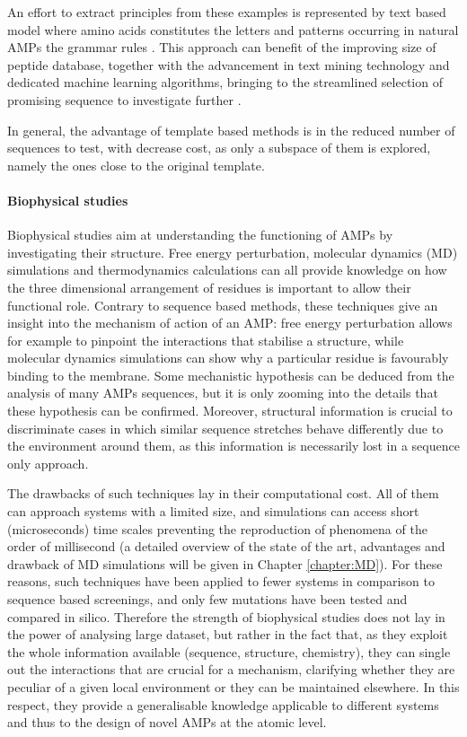 An effort to extract principles from these examples is represented by text based model where amino acids constitutes the letters and patterns occurring in natural AMPs the grammar rules \cite{Loose2006}.
This approach can benefit of the improving size of peptide database, together with the advancement in text mining technology and dedicated machine learning algorithms, bringing to the streamlined selection of promising sequence to investigate further \cite{Cipcigan2018}.

In general, the advantage of template based methods is in the reduced number of sequences to test, with decrease cost, as only a subspace of them is explored, namely the ones close to the original template.


\paragraph{Biophysical studies}
Biophysical studies aim at understanding the functioning of AMPs by investigating their structure. Free energy perturbation, molecular dynamics (MD) simulations and thermodynamics calculations can all provide knowledge on how the three dimensional arrangement of residues is important to allow their functional role.
%
Contrary to sequence based methods, these techniques give an insight into the mechanism of action of an AMP: free energy perturbation allows for example to pinpoint the interactions that stabilise a structure, while molecular dynamics simulations can show why a particular residue is favourably binding to the membrane. Some mechanistic hypothesis can be deduced from the analysis of many AMPs sequences, but it is only zooming into the details that these hypothesis can be confirmed. Moreover, structural information is crucial to discriminate cases in which similar sequence stretches behave differently due to the environment around them, as this information is necessarily lost in a sequence only approach.

The drawbacks of such techniques lay in their computational cost. All of them can approach systems with a limited size, and simulations can access short (microseconds) time scales preventing the reproduction of phenomena of the order of millisecond (a detailed overview of the state of the art, advantages and drawback of MD simulations will be given in Chapter \ref{chapter:MD}).
%
For these reasons, such techniques have been applied to fewer systems in comparison to sequence based screenings, and only few mutations have been tested and compared in silico.
%
Therefore the strength of biophysical studies does not lay in the power of analysing large dataset, but rather in the fact that, as they exploit the whole information available (sequence, structure, chemistry), they can single out the interactions that are crucial for a mechanism, clarifying whether they are peculiar of a given local environment or they can be maintained elsewhere. In this respect, they provide a generalisable knowledge applicable to different systems and thus to the design of novel AMPs at the atomic level.

